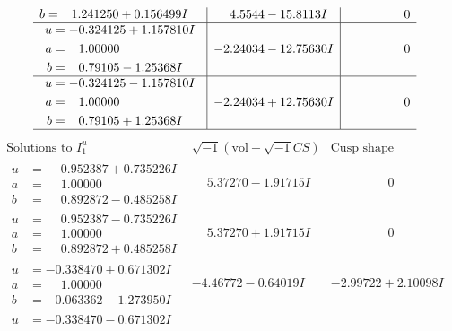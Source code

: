 \documentclass[1p]{elsarticle_modified}
\theoremstyle{definition}
\newcommand{\I}{\sqrt{-1}}
\begin{document}
$$\begin{array}{c|c|c}
\begin{aligned}
b &= \phantom{-}1.241250 + 0.156499 I\end{aligned}
 & \phantom{-}4.5544 - 15.8113 I & \phantom{-0.000000 } 0 \\ \hline\begin{aligned}
u &= -0.324125 + 1.157810 I \\
a &= \phantom{-}1.00000\phantom{ +0.000000I} \\
b &= \phantom{-}0.79105 - 1.25368 I\end{aligned}
 & -2.24034 - 12.75630 I & \phantom{-0.000000 } 0 \\ \hline\begin{aligned}
u &= -0.324125 - 1.157810 I \\
a &= \phantom{-}1.00000\phantom{ +0.000000I} \\
b &= \phantom{-}0.79105 + 1.25368 I\end{aligned}
 & -2.24034 + 12.75630 I & \phantom{-0.000000 } 0\\
 \hline 
 \end{array}$$\newpage$$\begin{array}{c|c|c}  
\text{Solutions to }I^u_{1}& \I (\text{vol} + \sqrt{-1}CS) & \text{Cusp shape}\\
 \hline 
\begin{aligned}
u &= \phantom{-}0.952387 + 0.735226 I \\
a &= \phantom{-}1.00000\phantom{ +0.000000I} \\
b &= \phantom{-}0.892872 - 0.485258 I\end{aligned}
 & \phantom{-}5.37270 - 1.91715 I & \phantom{-0.000000 } 0 \\ \hline\begin{aligned}
u &= \phantom{-}0.952387 - 0.735226 I \\
a &= \phantom{-}1.00000\phantom{ +0.000000I} \\
b &= \phantom{-}0.892872 + 0.485258 I\end{aligned}
 & \phantom{-}5.37270 + 1.91715 I & \phantom{-0.000000 } 0 \\ \hline\begin{aligned}
u &= -0.338470 + 0.671302 I \\
a &= \phantom{-}1.00000\phantom{ +0.000000I} \\
b &= -0.063362 - 1.273950 I\end{aligned}
 & -4.46772 - 0.64019 I & -2.99722 + 2.10098 I \\ \hline\begin{aligned}
u &= -0.338470 - 0.671302 I \\

\end{aligned}
\end{array}$$
\end{document}

